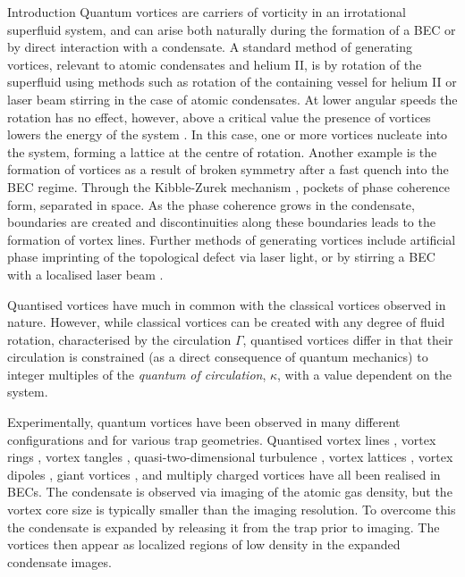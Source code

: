 \begin{chapter}{\label{cha:bose_gases}Introduction}
Quantum vortices are carriers of vorticity in an irrotational superfluid system, and can arise both naturally during the formation of a BEC or by direct interaction with a condensate. A standard method of generating vortices, relevant to atomic condensates and helium II, is by rotation of the superfluid \cite{PhysRevLett.43.214,PhysRevLett.84.806,hodby_2002,Abo-Shaeer476, PhysRevLett.87.210403} using methods such as rotation of the containing vessel for helium II or laser beam stirring in the case of atomic condensates. At lower angular speeds the rotation has no effect, however, above a critical value the presence of vortices lowers the energy of the system \cite{0953-8984-13-12-201,NozieresPines}. In this case, one or more vortices nucleate into the system, forming a lattice \cite{PhysRevLett.43.214,Abo-Shaeer476} at the centre of rotation. Another example is the formation of vortices as a result of broken symmetry after a fast quench into the BEC regime. Through the Kibble-Zurek mechanism \cite{0305-4470-9-8-029,Zurek85,KZvort99}, pockets of phase coherence form, separated in space. As the phase coherence grows in the condensate, boundaries are created and discontinuities along these boundaries leads to the formation of vortex lines. Further methods of generating vortices include artificial phase imprinting \cite{Cornell99,Dobrek99,Leanhardt99} of the topological defect via laser light, or by stirring a BEC with a localised laser beam \cite{PhysRevLett.84.806,hodby_2002,Abo-Shaeer476,jma00,Raman01,Inouye}.

Quantised vortices have much in common with the classical vortices observed in nature. However, while classical vortices can be created with any degree of fluid rotation, characterised by the circulation $\Gamma$, quantised vortices differ in that their circulation is constrained (as a direct consequence of quantum mechanics) to integer multiples of the {\it quantum of circulation}, $\kappa$, with a value dependent on the system.

Experimentally, quantum vortices have been observed in many different configurations and for various trap geometries. Quantised vortex lines \cite{Dutton27072001}, vortex rings \cite{PhysRevLett.86.2926}, vortex tangles \cite{Henn}, quasi-two-dimensional turbulence \cite{kwon_moon_14}, vortex lattices \cite{PhysRevLett.84.806,Abo-Shaeer476,abo_shaeer_2002,PhysRevLett.86.4443}, vortex dipoles \cite{Neely}, giant vortices \cite{PhysRevLett.90.170405}, and multiply charged vortices \cite{PhysRevLett.93.160406} have all been realised in BECs. The condensate is observed via imaging of the atomic gas density, but the vortex core size is typically smaller than the imaging resolution. To overcome this the condensate is expanded by releasing it from the trap prior to imaging. The vortices then appear as localized regions of low density in the expanded condensate images.


\end{chapter}
